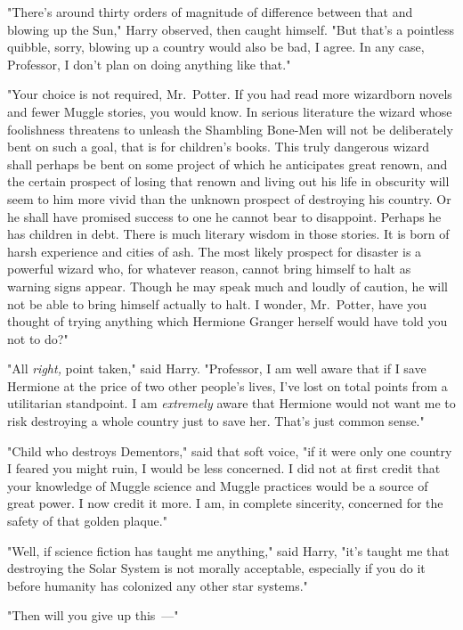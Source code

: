 "There's around thirty orders of magnitude of difference between that and
blowing up the Sun," Harry observed, then caught himself. "But that's a
pointless quibble, sorry, blowing up a country would also be bad, I agree. In
any case, Professor, I don't plan on doing anything like that."

"Your choice is not required, Mr.~Potter. If you had read more wizardborn
novels and fewer Muggle stories, you would know. In serious literature the
wizard whose foolishness threatens to unleash the Shambling Bone-Men will not
be deliberately bent on such a goal, that is for children's books. This truly
dangerous wizard shall perhaps be bent on some project of which he anticipates
great renown, and the certain prospect of losing that renown and living out his
life in obscurity will seem to him more vivid than the unknown prospect of
destroying his country. Or he shall have promised success to one he cannot bear
to disappoint. Perhaps he has children in debt. There is much literary wisdom
in those stories. It is born of harsh experience and cities of ash. The most
likely prospect for disaster is a powerful wizard who, for whatever reason,
cannot bring himself to halt as warning signs appear. Though he may speak much
and loudly of caution, he will not be able to bring himself actually to halt. I
wonder, Mr.~Potter, have you thought of trying anything which Hermione Granger
herself would have told you not to do?"

"All \emph{right,} point taken," said Harry. "Professor, I am well aware that
if I save Hermione at the price of two other people's lives, I've lost on total
points from a utilitarian standpoint. I am \emph{extremely} aware that Hermione
would not want me to risk destroying a whole country just to save her. That's
just common sense."

"Child who destroys Dementors," said that soft voice, "if it were only one
country I feared you might ruin, I would be less concerned. I did not at first
credit that your knowledge of Muggle science and Muggle practices would be a
source of great power. I now credit it more. I am, in complete sincerity,
concerned for the safety of that golden plaque."

"Well, if science fiction has taught me anything," said Harry, "it's taught me
that destroying the Solar System is not morally acceptable, especially if you
do it before humanity has colonized any other star systems."

"Then will you give up this~---"

